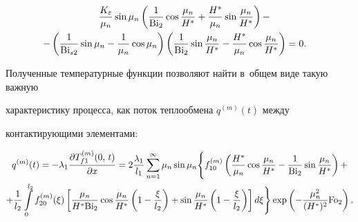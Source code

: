 \begin{multline}

\label{evdok:eq13}

\quad \frac{K_\varepsilon }{\mu _n }\sin \mu _n \left( {\frac{1}{{\rm Bi}_2 }\cos 

\frac{\mu _n }{H^\ast } + \frac{H^\ast }{\mu _n }\sin \frac{\mu _n }{H^\ast 

}} \right) -\\- \left( {\frac{1}{{\rm Bi}_{s2} }\sin \mu _n - \frac{1}{\mu _n }\cos 

\mu _n } \right)

\left( {\frac{1}{{\rm Bi}_2 }\sin \frac{\mu _n }{H^\ast } - \frac{H^\ast 

}{\mu _n }\cos \frac{\mu _n }{H^\ast }} \right) = 0.\quad 

\end{multline}



Полученные температурные функции позволяют найти в~общем виде такую важную 

характеристику процесса, как поток теплообмена $q^{(m)}(t)$ между 

контактирующими элементами:



\begin{multline}

\label{evdok:eq14} 

q^{(m)}(t) = - \lambda _1 

\frac{\partial T_{f1}^{(m)} (0,\,t)}{\partial x} = 

2\frac{\lambda _1 }{l_1 }

\sum\limits_{n = 1}^\infty 

\mu _n \sin \mu _n \Bigg\{ f_{10}^{(m)} \left( \frac{H^\ast }{\mu _n }\cos \frac{\mu _n 

}{H^\ast } - \frac{1}{{\rm Bi}_2 }\sin \frac{\mu _n }{H^\ast } \right)  

+ \\

  + \frac{1}{l_2 }\int\limits_0^{l_2 } {f_{20}^{(m)} (\xi )} \left[ 

{\frac{\mu _n }{H^\ast {\rm Bi}_2 }\cos \frac{\mu _n }{H^\ast }\left( {1 - 

\frac{\xi }{l_2 }} \right) + \sin \frac{\mu _n }{H^\ast }\left( {1 - 

\frac{\xi }{l_2 }} \right)} \right]d\xi  \Bigg\} \exp \left( { - \frac{\mu 

_n^2 }{(H^\ast )^2}{\rm Fo}_2 } \right).

\end{multline}





